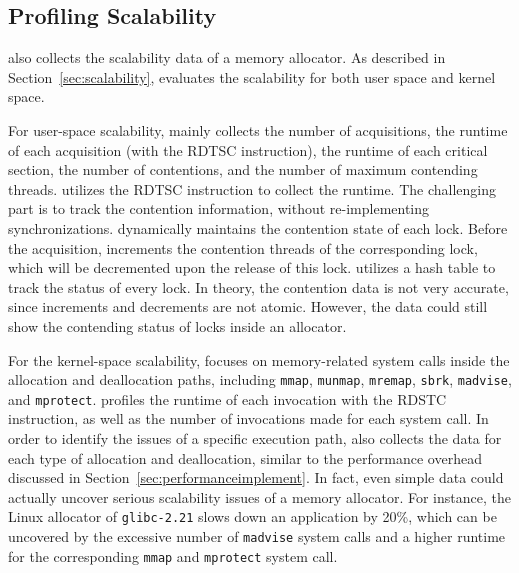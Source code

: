   
 

\subsection{Profiling Scalability}
\label{sec:profilingscale}

\MP{} also collects the scalability data of a memory allocator. As described in Section~\ref{sec:scalability}, \MP{} evaluates the scalability for both user space and kernel space. 

For user-space scalability, \MP{} mainly collects the number of acquisitions, the runtime of each acquisition (with the RDTSC instruction), the runtime of each critical section, the number of contentions, and the number of maximum contending threads. \MP{} utilizes the RDTSC instruction to collect the runtime. The challenging part is to track the contention information, without re-implementing synchronizations. \MP{} dynamically maintains the contention state of each lock. Before the acquisition, \MP{} increments the contention threads of the corresponding lock, which will be decremented upon the release of this lock. \MP{} utilizes a hash table to track the status of every lock. In theory, the contention data is not very accurate, since increments and decrements are not atomic. However, the data could still show the contending status of locks inside an allocator.    

For the kernel-space scalability, \MP{} focuses on memory-related system calls inside the allocation and deallocation paths, including \texttt{mmap}, \texttt{munmap}, \texttt{mremap}, \texttt{sbrk}, \texttt{madvise}, and \texttt{mprotect}. \MP{} profiles the runtime of each invocation with the RDSTC instruction, as well as the number of invocations made for each system call. In order to identify the issues of a specific execution path, \MP{} also collects the data for each type of allocation and deallocation, similar to the performance overhead discussed in Section~\ref{sec:performanceimplement}.
In fact, even simple data could actually uncover serious scalability issues of a memory allocator. For instance, the Linux allocator of \texttt{glibc-2.21} slows down an application by 20\%, which can be uncovered by the excessive number of \texttt{madvise} system calls and a higher runtime for the corresponding \texttt{mmap} and \texttt{mprotect} system call. 


